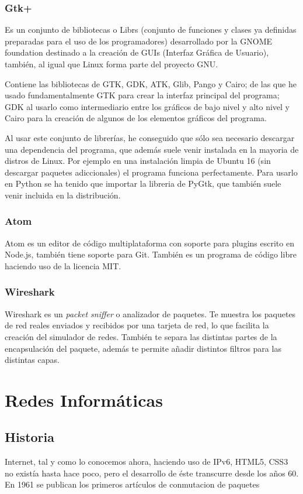 \documentclass[a4paper, 11pt]{report} %
\begin{document}
\subsection{Gtk+}
Es un conjunto de bibliotecas o \glspl{Libr} (conjunto de funciones y clases ya definidas preparadas para el uso de los programadores) desarrollado por la GNOME foundation destinado a la creación de GUIs (Interfaz Gráfica de Usuario), también, al igual que Linux forma parte del proyecto GNU.

Contiene las bibliotecas de GTK, GDK, ATK, Glib, Pango y Cairo; de las que he usado fundamentalmente GTK para crear la interfaz principal del programa; GDK al usarlo como intermediario entre los gráficos de bajo nivel y alto nivel y Cairo para la creación de algunos de los elementos gráficos del programa.

Al usar este conjunto de librerías, he conseguido que sólo sea necesario descargar una dependencia del programa, que además suele venir instalada en la mayoria de distros de Linux. Por ejemplo en una instalación limpia de Ubuntu 16 (sin descargar paquetes adiccionales) el programa funciona perfectamente. Para usarlo en Python se ha tenido que importar la libreria de PyGtk, que también suele venir incluida en la distribución.
\subsection{Atom}
Atom es un editor de código multiplataforma con soporte para plugins escrito en Node.js, también tiene soporte para Git. También es un programa de código libre haciendo uso de la licencia MIT.

\subsection{Wireshark}
\label{wireshark}
Wireshark es un \textit{packet sniffer} o analizador de paquetes. Te muestra los paquetes de red reales enviados y recibidos por una tarjeta de red, lo que facilita la creación del simulador de redes. También te separa las distintas partes de la encapsulación del paquete, además te permite añadir distintos filtros para las distintas capas.

\chapter{Redes Informáticas}
\section*{Historia}
Internet, tal y como lo conocemos ahora, haciendo uso de IPv6, HTML5, CSS3 no existía hasta hace poco, pero el desarrollo de éste transcurre desde los años 60. En 1961 se publican los primeros artículos de \gls{conmutacion de paquetes}
\end{document}
